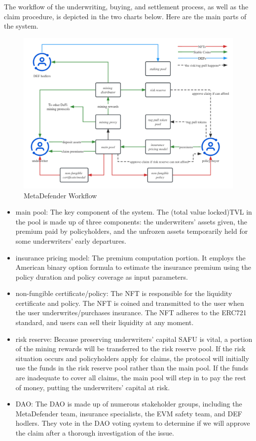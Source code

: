 The workflow of the underwriting, buying, and settlement process, as well as the claim procedure, is depicted in the two charts below.
Here are the main parts of the system.

\begin{figure}[H]
	\includegraphics[width=\linewidth]{../workflow_process_on} %
	\caption{MetaDefender Workflow} %
	\label{fig:workflow} %
\end{figure}

\begin{itemize}
    \item main pool: The key component of the system.
	The (total value locked)TVL in the pool is made up of three components: the underwriters' assets given, the premium paid by policyholders, and the unfrozen assets temporarily held for some underwriters' early departures.
	\item insurance pricing model: The premium computation portion.
	It employs the American binary option formula to estimate the insurance premium using the policy duration and policy coverage as input parameters.
	\item non-fungible certificate/policy: The NFT is responsible for the liquidity certificate and policy.
	The NFT is coined and transmitted to the user when the user underwrites/purchases insurance.
	The NFT adheres to the ERC721 standard, and users can sell their liquidity at any moment.
	\item risk reserve: Because preserving underwriters' capital SAFU is vital, a portion of the mining rewards will be transferred to the risk reserve pool.
	If the risk situation occurs and policyholders apply for claims, the protocol will initially use the funds in the risk reserve pool rather than the main pool.
	If the funds are inadequate to cover all claims, the main pool will step in to pay the rest of money, putting the underwriters' capital at risk.
	\item DAO: The DAO is made up of numerous stakeholder groups, including the MetaDefender team, insurance specialists, the EVM safety team, and DEF hodlers.
	They vote in the DAO voting system to determine if we will approve the claim after a thorough investigation of the issue.
\end{itemize}
